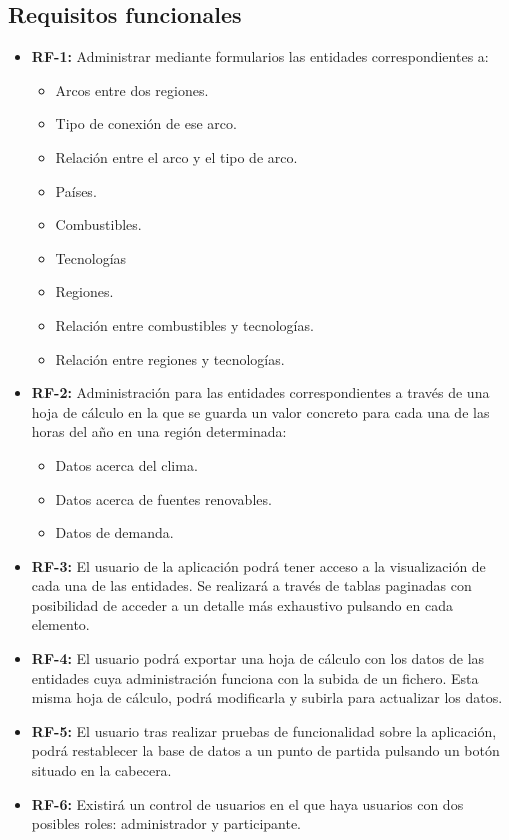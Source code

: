 \subsection{Requisitos funcionales}

\begin{itemize}
	
	\item \textbf{RF-1:} Administrar mediante formularios las entidades correspondientes a: 

		\begin{itemize}
			
			\item Arcos entre dos regiones.
			\item Tipo de conexión de ese arco.
			\item Relación entre el arco y el tipo de arco.
			\item Países.
			\item Combustibles.
			\item Tecnologías
			\item Regiones.
			\item Relación entre combustibles y tecnologías.
			\item Relación entre regiones y tecnologías.
			
		\end{itemize}
	
	\item \textbf{RF-2:} Administración para las entidades correspondientes a través de una hoja de cálculo en la que se guarda un valor concreto para cada una de las horas del año en una región determinada:
	
		\begin{itemize}
			
			\item Datos acerca del clima.
			\item Datos acerca de fuentes renovables.
			\item Datos de demanda.
			
		\end{itemize}
	
	\item \textbf{RF-3:} El usuario de la aplicación podrá tener acceso a la visualización de cada una de las entidades. Se realizará a través de tablas paginadas con posibilidad de acceder a un detalle más exhaustivo pulsando en cada elemento.
	
	\item \textbf{RF-4:} El usuario podrá exportar una hoja de cálculo con los datos de las entidades cuya administración funciona con la subida de un fichero. Esta misma hoja de cálculo, podrá modificarla y subirla para actualizar los datos.
	
	\item \textbf{RF-5:} El usuario tras realizar pruebas de funcionalidad sobre la aplicación, podrá restablecer la base de datos a un punto de partida pulsando un botón situado en la cabecera.
	
	\item \textbf{RF-6:} Existirá un control de usuarios en el que haya usuarios con dos posibles roles: administrador y participante.
	
\end{itemize}

